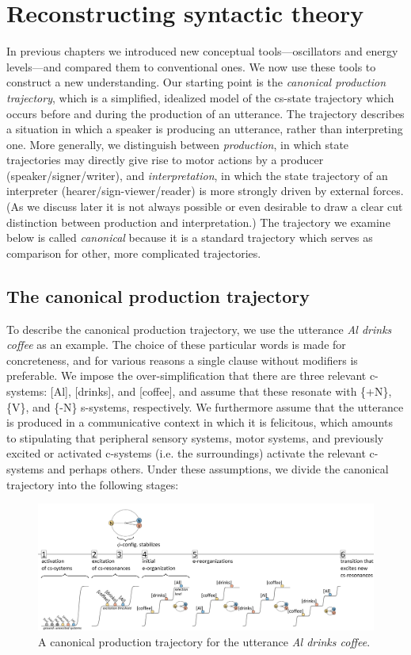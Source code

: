\chapter{Reconstructing syntactic theory}

In previous chapters we introduced new conceptual tools—oscillators and energy levels—and compared them to conventional ones. We now use these tools to construct a new understanding. Our starting point is the \textit{canonical production trajectory}, which is a simplified, idealized model of the cs-state trajectory which occurs before and during the production of an utterance. The trajectory describes a situation in which a speaker is producing an utterance, rather than interpreting one. More generally, we distinguish between \textit{production}, in which state trajectories may directly give rise to motor actions by a producer (speaker/signer/writer), and \textit{interpretation}, in which the state trajectory of an interpreter (hearer/sign-viewer/reader) is more strongly driven by external forces. (As we discuss later it is not always possible or even desirable to draw a clear cut distinction between production and interpretation.) The trajectory we examine below is called \textit{canonical} because it is a standard trajectory which serves as comparison for other, more complicated trajectories.

\section{The canonical production trajectory}

To describe the canonical production trajectory, we use the utterance \textit{Al drinks coffee} as an example. The choice of these particular words is made for concreteness, and for various reasons a single clause without modifiers is preferable. We impose the over-simplification that there are three relevant c-systems: [Al], [drinks], and [coffee], and assume that these resonate with \{+N\}, \{V\}, and \{-N\} s-systems, respectively. We furthermore assume that the utterance is produced in a communicative context in which it is felicitous, which amounts to stipulating that peripheral sensory systems, motor systems, and previously excited or activated c-systems (i.e. the surroundings) activate the relevant c-systems and perhaps others. Under these assumptions, we divide the canonical trajectory into the following stages:

  
\begin{figure}
\includegraphics[width=\textwidth]{figures/Tilsen-img51.png}
\caption{A canonical production trajectory for the utterance \textit{Al drinks coffee}.}
\label{fig:4:1}
\end{figure}
 

